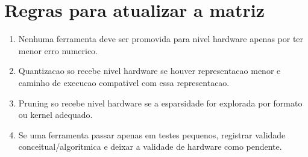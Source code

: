 \section{Regras para atualizar a matriz}


\begin{enumerate}
\item Nenhuma ferramenta deve ser promovida para nivel hardware apenas por ter
menor erro numerico.
\item Quantizacao so recebe nivel hardware se houver representacao menor e caminho
de execucao compativel com essa representacao.
\item Pruning so recebe nivel hardware se a esparsidade for explorada por formato
ou kernel adequado.
\item Se uma ferramenta passar apenas em testes pequenos, registrar validade
conceitual/algoritmica e deixar a validade de hardware como pendente.
\end{enumerate}
